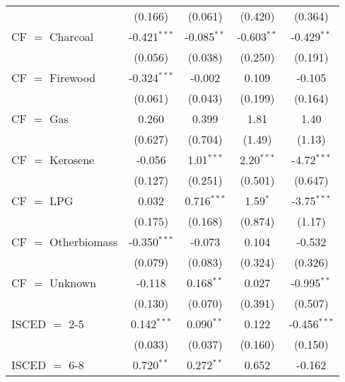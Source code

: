 \begin{table}[htbp!]
\begin{adjustbox}{width = 1\textwidth, max height = 0.95\textheight, center}
\begin{threeparttable}[b]
\begin{tabular}{lcccc}
                                 & (0.166)            & (0.061)            & (0.420)        & (0.364)\\   
            CF $=$ Charcoal      & -0.421$^{***}$     & -0.085$^{**}$      & -0.603$^{**}$  & -0.429$^{**}$\\   
                                 & (0.056)            & (0.038)            & (0.250)        & (0.191)\\   
            CF $=$ Firewood      & -0.324$^{***}$     & -0.002             & 0.109          & -0.105\\   
                                 & (0.061)            & (0.043)            & (0.199)        & (0.164)\\   
            CF $=$ Gas           & 0.260              & 0.399              & 1.81           & 1.40\\   
                                 & (0.627)            & (0.704)            & (1.49)         & (1.13)\\   
            CF $=$ Kerosene      & -0.056             & 1.01$^{***}$       & 2.20$^{***}$   & -4.72$^{***}$\\   
                                 & (0.127)            & (0.251)            & (0.501)        & (0.647)\\   
            CF $=$ LPG           & 0.032              & 0.716$^{***}$      & 1.59$^{*}$     & -3.75$^{***}$\\   
                                 & (0.175)            & (0.168)            & (0.874)        & (1.17)\\   
            CF $=$ Otherbiomass  & -0.350$^{***}$     & -0.073             & 0.104          & -0.532\\   
                                 & (0.079)            & (0.083)            & (0.324)        & (0.326)\\   
            CF $=$ Unknown       & -0.118             & 0.168$^{**}$       & 0.027          & -0.995$^{**}$\\   
                                 & (0.130)            & (0.070)            & (0.391)        & (0.507)\\   
            ISCED $=$ 2-5        & 0.142$^{***}$      & 0.090$^{**}$       & 0.122          & -0.456$^{***}$\\   
                                 & (0.033)            & (0.037)            & (0.160)        & (0.150)\\   
            ISCED $=$ 6-8        & 0.720$^{**}$       & 0.272$^{**}$       & 0.652          & -0.162\\   

\end{tabular}
\end{threeparttable}
\end{adjustbox}
\end{table}
